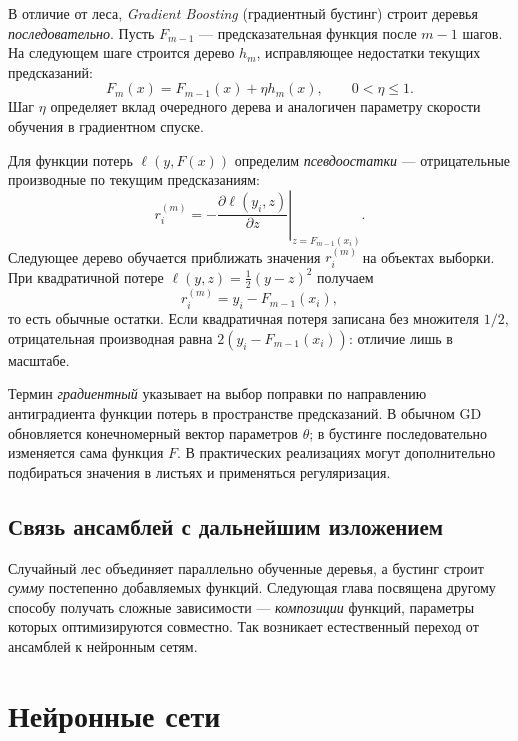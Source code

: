 \documentclass[12pt,a4paper]{article}
\begin{document}
В отличие от леса, \emph{Gradient Boosting} (градиентный бустинг)
строит деревья \emph{последовательно}. Пусть $F_{m-1}$ ---
предсказательная функция после $m-1$ шагов.
На следующем шаге строится дерево $h_m$, исправляющее
недостатки текущих предсказаний:
\begin{equation}
    F_m(x)=F_{m-1}(x)+\eta h_m(x),
    \qquad 0<\eta\le1.
    \label{eq:gb-update}
\end{equation}
Шаг $\eta$ определяет вклад очередного дерева и
аналогичен параметру скорости обучения в градиентном спуске.

Для функции потерь $\ell(y,F(x))$ определим
\emph{псевдоостатки} --- отрицательные производные
по текущим предсказаниям:
\begin{equation}
    r_i^{(m)}=
    -\left.\frac{\partial\ell(y_i,z)}{\partial z}
    \right|_{z=F_{m-1}(x_i)}.
    \label{eq:pseudo-residual}
\end{equation}
Следующее дерево обучается приближать значения
$r_i^{(m)}$ на объектах выборки. При квадратичной потере
$\ell(y,z)=\tfrac12(y-z)^2$ получаем
\[
    r_i^{(m)}=y_i-F_{m-1}(x_i),
\]
то есть обычные остатки. Если квадратичная потеря записана
без множителя $1/2$, отрицательная производная равна
$2(y_i-F_{m-1}(x_i))$: отличие лишь в масштабе.

Термин \emph{градиентный} указывает на выбор поправки
по направлению антиградиента функции потерь
в пространстве предсказаний. В обычном GD обновляется
конечномерный вектор параметров $\theta$;
в бустинге последовательно изменяется сама функция $F$.
В практических реализациях могут дополнительно подбираться
значения в листьях и применяться регуляризация.

\subsection{Связь ансамблей с дальнейшим изложением}

Случайный лес объединяет параллельно обученные деревья,
а бустинг строит \emph{сумму} постепенно добавляемых функций.
Следующая глава посвящена другому способу получать сложные
зависимости --- \emph{композиции} функций, параметры которых
оптимизируются совместно. Так возникает естественный переход
от ансамблей к нейронным сетям.

\section{Нейронные сети}
\end{document}
